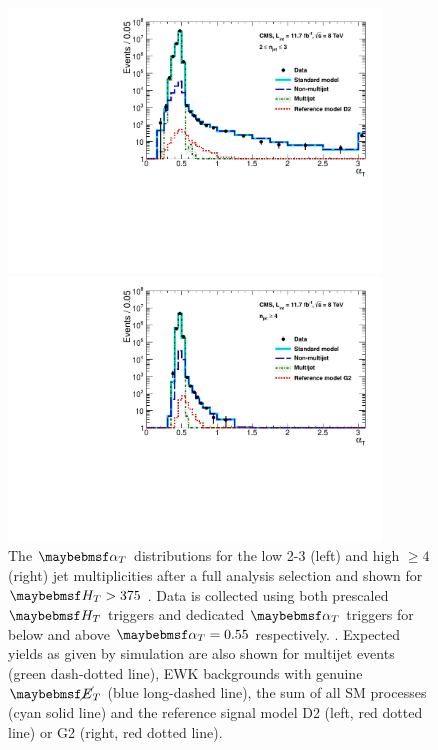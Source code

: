 \begin{figure}[ht]
\centering
\begin{minipage}[b]{0.48 \linewidth}
\includegraphics[width = 1.0\linewidth,height = 7.0cm]{plots/alphat_low.pdf}
\end{minipage}
\quad
\begin{minipage}[b]{0.48\linewidth}
\includegraphics[width = 1.0\linewidth, height = 7.0cm]{plots/alphat_high.pdf}
\end{minipage}
\caption[ The $\alphat$ distributions for the low 2-3 (left) and high $\geq 4$ (right) jet multiplicities after a full analysis selection and shown for $\theht > 375$.]{The $\alphat$ distributions for the low 2-3 (left) and high $\geq 4$ (right) jet multiplicities after a full analysis selection and shown for $\theht > 375$ . Data is collected using both prescaled $\theht$ triggers and dedicated $\alphat$ triggers for below and above $\alphat = 0.55$ respectively. . Expected yields as given by simulation are also shown for multijet events (green dash-dotted line), \ac{EWK} backgrounds with genuine $\met$ (blue long-dashed line), the sum of all \ac{SM} processes (cyan solid line) and the reference signal model D2 (left, red dotted line) or G2 (right, red dotted line). }
\label{fig:fullalphatdistribution}
\end{figure}

